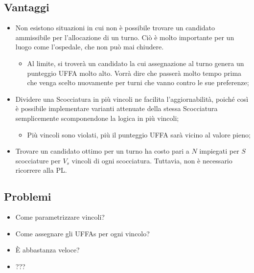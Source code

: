 \documentclass[compress]{beamer}
\begin{document}
\subsection{Vantaggi}
\begin{frame}{\subsecname}
    \begin{itemize}
        \item Non esistono situazioni in cui non è possibile trovare un candidato
        ammissibile per l'allocazione di un turno. Ciò è molto importante per un luogo
        come l'ospedale, che non può mai chiudere.
        \begin{itemize}
            \item Al limite, si troverà un candidato la cui assegnazione al turno
            genera un punteggio UFFA molto alto. Vorrà dire che passerà molto tempo
            prima che venga scelto nuovamente per turni che vanno contro le sue
            preferenze;
        \end{itemize}
        \item Dividere una Scocciatura in più vincoli ne facilita l'aggiornabilità,
        poiché così è possibile implementare varianti attenuate della stessa
        Scocciatura semplicemente scomponendone la logica in più vincoli;
        \begin{itemize}
            \item Più vincoli sono violati, più il punteggio UFFA sarà vicino al valore
            pieno;
        \end{itemize}
        \item Trovare un candidato ottimo per un turno ha costo pari a $N$ impiegati
        per $S$ scocciature per $V_s$ vincoli di ogni scocciatura. Tuttavia, non è
        necessario ricorrere alla PL.
    \end{itemize}
\end{frame}
\subsection{Problemi}
\begin{frame}{\subsecname}
    \begin{itemize}
        \item Come parametrizzare vincoli?
        \item Come assegnare gli UFFAs per ogni vincolo?
        \item È abbastanza veloce?
        \item ???
    \end{itemize}
\end{frame}
\end{document}
